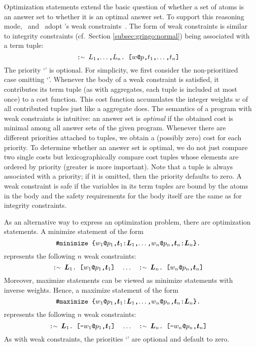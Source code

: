Optimization statements extend the basic question of
whether a set of atoms is an answer set to
whether it is an optimal answer set.
To support this reasoning mode, \gringo\ and \clingo\ adopt \dlv's weak constraints~\cite{bflnrp00}.
The form of weak constraints is similar to integrity constraints (cf.~Section \ref{subsec:gringo:normal})
being associated with a term tuple:
\[
    \code{:{\raise.17ex\hbox{$\scriptstyle\sim$}}~$L_1$,$\dots$,$L_n$.~[$w$@$p$,$t_1$,$\dots$,$t_n$]}
\]
The priority `' is optional.
For simplicity, we first consider the non-prioritized case omitting `'.
Whenever the body of a weak constraint is satisfied,
it contributes its term tuple (as with aggregates, each tuple is included at most once) to a cost function.
This cost function accumulates the integer weights $w$ of all contributed tuples just like a  aggregate does.
The semantics of a program with weak constraints is intuitive:
an answer set is \emph{optimal}
if the obtained cost is minimal among all answer sets of the given program.
Whenever there are different priorities attached to tuples,
we obtain a (possibly zero) cost for each priority.
To determine whether an answer set is optimal,
we do not just compare two single costs
but lexicographically compare cost tuples whose elements are ordered by priority (greater is more important).
Note that a tuple is always associated with a priority;
if it is omitted, then the priority defaults to zero.
A weak constraint is safe if the variables in its term tuples are bound by the atoms in the body
and the safety requirements for the body itself are the same as for integrity constraints.

As an alternative way to express an optimization problem,
there are optimization statements.
A minimize statement of the form
\[
    \texttt{\#minimize \{$w_1$@$p_1$,$\boldsymbol{t}_1$:$\boldsymbol{L}_1$,$\dots$,$w_n$@$p_n$,$\boldsymbol{t}_n$:$\boldsymbol{L}_n$\}.}
\]
represents the following $n$ weak constraints:
\[
    \code{:{\raise.17ex\hbox{$\scriptstyle\sim$}}~$\boldsymbol{L}_1$.~[$w_1$@$p_1$,$\boldsymbol{t}_1$]}
    \quad \dots \quad
    \code{:{\raise.17ex\hbox{$\scriptstyle\sim$}}~$\boldsymbol{L}_n$.~[$w_n$@$p_n$,$\boldsymbol{t}_n$]}
\]
%
Moreover, maximize statements can be viewed as minimize statements
with inverse weights.
Hence, a maximize statement of the form
\[
    \texttt{\#maximize \{$w_1$@$p_1$,$\boldsymbol{t}_1$:$\boldsymbol{L}_1$,$\dots$,$w_n$@$p_n$,$\boldsymbol{t}_n$:$\boldsymbol{L}_n$\}.}
\]
represents the following $n$ weak constraints:
\[
    \code{:{\raise.17ex\hbox{$\scriptstyle\sim$}}~$\boldsymbol{L}_1$.~[-$w_1$@$p_1$,$\boldsymbol{t}_1$]}
    \quad \dots \quad
    \code{:{\raise.17ex\hbox{$\scriptstyle\sim$}}~$\boldsymbol{L}_n$.~[-$w_n$@$p_n$,$\boldsymbol{t}_n$]}
\]
As with weak constraints, the priorities `' are optional
and default to zero.

